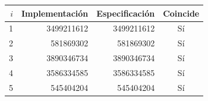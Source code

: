 \begin{tabular}{rrrc}
\toprule
$i$ & Implementación & Especificación & Coincide \\
\midrule
1 & 3499211612 & 3499211612 & Sí \\
2 & 581869302 & 581869302 & Sí \\
3 & 3890346734 & 3890346734 & Sí \\
4 & 3586334585 & 3586334585 & Sí \\
5 & 545404204 & 545404204 & Sí \\
\bottomrule
\end{tabular}
